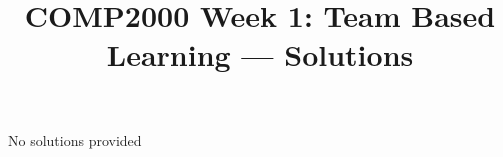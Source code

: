 \documentclass[twoside=false,DIV=14]{scrartcl}
\title{\color{redish} \vspace{-1em}COMP2000 Week 1: Team Based Learning --- Solutions}
\begin{document}
{\color{blackish}\maketitle}\vspace{-7em}

No solutions provided
\end{document}
